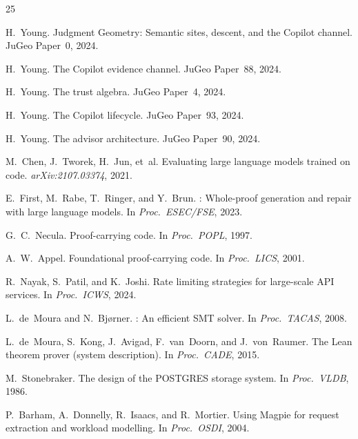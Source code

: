 \documentclass[11pt]{article}
\begin{document}
\begin{thebibliography}{25}

H.~Young.
\newblock Judgment Geometry: Semantic sites, descent, and the
  Copilot channel.
\newblock JuGeo Paper~0, 2024.

H.~Young.
\newblock The Copilot evidence channel.
\newblock JuGeo Paper~88, 2024.

H.~Young.
\newblock The trust algebra.
\newblock JuGeo Paper~4, 2024.

H.~Young.
\newblock The Copilot lifecycle.
\newblock JuGeo Paper~93, 2024.

H.~Young.
\newblock The advisor architecture.
\newblock JuGeo Paper~90, 2024.

M.~Chen, J.~Tworek, H.~Jun, et~al.
\newblock Evaluating large language models trained on code.
\newblock \emph{arXiv:2107.03374}, 2021.

E.~First, M.~Rabe, T.~Ringer, and Y.~Brun.
: Whole-proof generation and repair with large
  language models.
\newblock In \emph{Proc.\ ESEC/FSE}, 2023.

G.~C.~Necula.
\newblock Proof-carrying code.
\newblock In \emph{Proc.\ POPL}, 1997.

A.~W.~Appel.
\newblock Foundational proof-carrying code.
\newblock In \emph{Proc.\ LICS}, 2001.

R.~Nayak, S.~Patil, and K.~Joshi.
\newblock Rate limiting strategies for large-scale {API} services.
\newblock In \emph{Proc.\ ICWS}, 2024.

L.~de~Moura and N.~Bj{\o}rner.
: An efficient {SMT} solver.
\newblock In \emph{Proc.\ TACAS}, 2008.

L.~de~Moura, S.~Kong, J.~Avigad, F.~van~Doorn, and
  J.~von~Raumer.
\newblock The {Lean} theorem prover (system description).
\newblock In \emph{Proc.\ CADE}, 2015.

M.~Stonebraker.
\newblock The design of the {POSTGRES} storage system.
\newblock In \emph{Proc.\ VLDB}, 1986.

P.~Barham, A.~Donnelly, R.~Isaacs, and R.~Mortier.
\newblock Using {Magpie} for request extraction and workload
  modelling.
\newblock In \emph{Proc.\ OSDI}, 2004.


\end{thebibliography}
\end{document}
